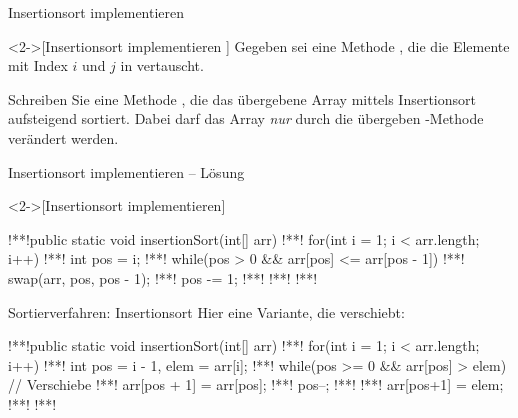 \ifull
\begin{frame}[fragile,c]{Insertionsort implementieren}
    \begin{exercise}<2->[Insertionsort implementieren ]
        \pause{}Gegeben sei eine Methode , die die Elemente mit Index \(i\) und \(j\) in  vertauscht.\medskip\par\pause Schreiben Sie eine Methode , die das übergebene Array mittels Insertionsort aufsteigend sortiert. Dabei darf das Array \emph{nur} durch die übergeben -Methode verändert werden.
    \end{exercise}
\end{frame}

\begin{frame}[fragile,c]{Insertionsort implementieren -- Lösung}
    \begin{solve}<2->[Insertionsort implementieren]
\begin{plainjava}
!**!public static void insertionSort(int[] arr) {
!**!    for(int i = 1; i < arr.length; i++) {
!**!        int pos = i;
!**!        while(pos > 0 && arr[pos] <= arr[pos - 1]) {
!**!            swap(arr, pos, pos - 1);
!**!            pos -= 1;
!**!        }
!**!    }
!**!}
    \end{plainjava}
    \end{solve}
\end{frame}
\fi

\begin{frame}[fragile,c]{Sortierverfahren: Insertionsort}
    \pause Hier eine Variante, die verschiebt:
    \begin{plainjava}
!**!public static void insertionSort(int[] arr) {
!**!    for(int i = 1; i < arr.length; i++) {
!**!        int pos = i - 1, elem = arr[i];
!**!        while(pos >= 0 && arr[pos] > elem) { // Verschiebe
!**!            arr[pos + 1] = arr[pos];
!**!            pos--;
!**!        }
!**!        arr[pos+1] = elem;
!**!    }
!**!}
    \end{plainjava}
\end{frame}


\def\List#1#2{
\foreach[count=\i,remember=\i as \li(initially 0)] \n in {#1}{
    \ifnum\i<#2
        \node[inner sep=4pt,ball,outer sep=2pt] (\i) at(1.25*\i,0) {\n};
    \else
        \node[inner sep=4pt,iball,outer sep=2pt] (\i) at(1.25*\i,0) {\n};
    \fi
    \ifnum\i>1
        \draw (\li.east) -- (\i.west);
    \fi
}}

